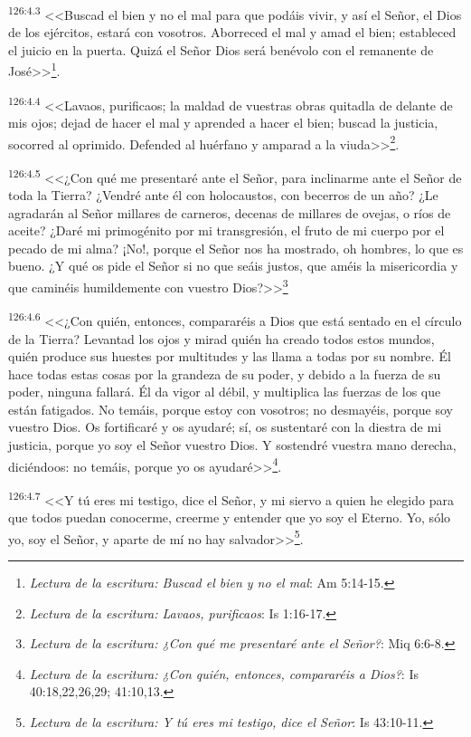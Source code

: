 \par 
\textsuperscript{126:4.3} <<Buscad el bien y no el mal para que podáis vivir, y así el Señor, el Dios de los ejércitos, estará con vosotros. Aborreced el mal y amad el bien; estableced el juicio en la puerta. Quizá el Señor Dios será benévolo con el remanente de José>>\footnote{\textit{Lectura de la escritura: Buscad el bien y no el mal}: Am 5:14-15.}.

\par 
\textsuperscript{126:4.4} <<Lavaos, purificaos; la maldad de vuestras obras quitadla de delante de mis ojos; dejad de hacer el mal y aprended a hacer el bien; buscad la justicia, socorred al oprimido. Defended al huérfano y amparad a la viuda>>\footnote{\textit{Lectura de la escritura: Lavaos, purificaos}: Is 1:16-17.}.

\par 
\textsuperscript{126:4.5} <<¿Con qué me presentaré ante el Señor, para inclinarme ante el Señor de toda la Tierra? ¿Vendré ante él con holocaustos, con becerros de un año? ¿Le agradarán al Señor millares de carneros, decenas de millares de ovejas, o ríos de aceite? ¿Daré mi primogénito por mi transgresión, el fruto de mi cuerpo por el pecado de mi alma? ¡No!, porque el Señor nos ha mostrado, oh hombres, lo que es bueno. ¿Y qué os pide el Señor si no que seáis justos, que améis la misericordia y que caminéis humildemente con vuestro Dios?>>\footnote{\textit{Lectura de la escritura: ¿Con qué me presentaré ante el Señor?}: Miq 6:6-8.}

\par 
\textsuperscript{126:4.6} <<¿Con quién, entonces, compararéis a Dios que está sentado en el círculo de la Tierra? Levantad los ojos y mirad quién ha creado todos estos mundos, quién produce sus huestes por multitudes y las llama a todas por su nombre. Él hace todas estas cosas por la grandeza de su poder, y debido a la fuerza de su poder, ninguna fallará. Él da vigor al débil, y multiplica las fuerzas de los que están fatigados. No temáis, porque estoy con vosotros; no desmayéis, porque soy vuestro Dios. Os fortificaré y os ayudaré; sí, os sustentaré con la diestra de mi justicia, porque yo soy el Señor vuestro Dios. Y sostendré vuestra mano derecha, diciéndoos: no temáis, porque yo os ayudaré>>\footnote{\textit{Lectura de la escritura: ¿Con quién, entonces, compararéis a Dios?}: Is 40:18,22,26,29; 41:10,13.}.

\par 
\textsuperscript{126:4.7} <<Y tú eres mi testigo, dice el Señor, y mi siervo a quien he elegido para que todos puedan conocerme, creerme y entender que yo soy el Eterno. Yo, sólo yo, soy el Señor, y aparte de mí no hay salvador>>\footnote{\textit{Lectura de la escritura: Y tú eres mi testigo, dice el Señor}: Is 43:10-11.}.

